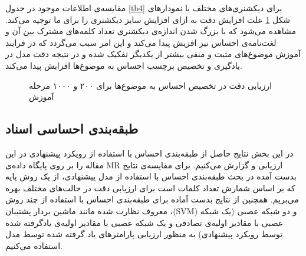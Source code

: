 \documentclass[12pt,a4paper]{article}
\begin{document}
مقایسه‌ی اطلاعات موجود در جدول
\ref{tb4}
برای دیکشنری‌های مختلف با نمودار‌های شکل
\ref{fig6}
علت افزایش دقت به ازای افزایش  سایز دیکشنری را برای ما توجیه می‌‌کند. مشاهده می‌‌شود که با بزرگ شدن اندازه‌ی دیکشنری تعداد کلمه‌های مشترک بین آن و لغت‌نامه‌ی احساس نیز افزیش پیدا می‌‌کند و این امر سبب می‌گردد که در فرایند آموزش  موضوع‌های مثبت و منفی‌ بیشتر از یکدیگر تفکیک شده و در نتیجه دقت مدل در یادگیری و تخصیص برچسب احساس به موضوع‌ها افزایش پیدا می‌‌کند.
\begin{figure}[!t]
	\centering
	\caption{ارزیابی دقت در تخصیص احساس به موضوع‌ها برای ۲۰۰ و ۱۰۰۰ مرحله آموزش}
	\label{fig6}
\end{figure}

\subsection{طبقه‌بندی احساسی اسناد}
\label{sec8}
در این بخش نتایج حاصل از طبقه‌بندی احساس با استفاده از رویکرد پیشنهادی در این مقاله را بر روی پایگاه داده‌ی MR ارزیابی و گزارش می‌‌کنیم. برای مقایسه‌ی نتایج بدست آمده در بحث طبقه‌بندی احساس با استفاده از مدل پیشنهادی، از یک روش پایه که بر اساس شمارش تعداد کلمات است برای ارزیابی دقت در حالت‌های مختلف بهره می‌‌بریم. همچنین از نتایج بدست آماده برای طبقه‌بندی احساس با استفاده از چند روش معروف نظارت شده مانند ماشین بردار پشتیبان ،(SVM) و دو شبکه عصبی (یک شبکه‌ عصبی با مقادیر اولیه‌ی تصادفی و یک شبکه‌ عصبی با مقادیر اولیه‌ی یادگرفته شده توسط رویکرد پیشنهادی) به منظور ارزیابی پارامترهای یاد گرفته شده توسط مدل استفاده می‌کنیم.
\end{document}
